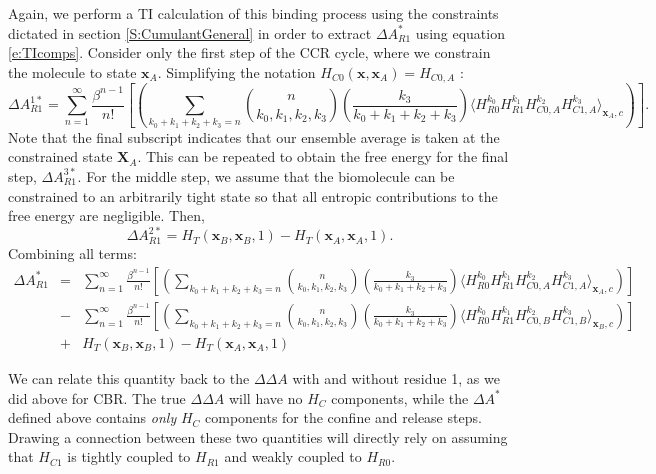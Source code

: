 \documentclass[%
 preprint,
 amsmath,amssymb,
 aps,
]{revtex4-1}
\renewcommand{\vec}[1]{{\mathbf{#1}}}
\begin{document}
 
 Again,
 we perform a TI calculation of this binding process using the constraints dictated in section \ref{S:CumulantGeneral} in order to extract $\Delta A^*_{R1}$ using equation \ref{e:TIcomps}.  Consider only the first step of the CCR cycle, where we constrain the molecule to state $\vec{x}_A$.  Simplifying the notation $H_{C0}\left( \vec{x},\vec{x}_A  \right) = H_{C0,A}$ : 
 \begin{equation}
\Delta A^{1*}_ {R1}=
\sum_{n=1}^{\infty}  \frac{\beta^{n-1}}{n!} 
\left[
\left(
 \sum_{k_0+k_1+k_2+k_3=n} 
{ n \choose k_0,k_1,k_2,k_3 } \left( \frac{k_3}{k_0+k_1+k_2+k_3} \right) \langle  
H_{R0}^{k_0} H_{R1}^{k_1} H_{C0,A}^{k_2} H_{C1,A}^{k_3} 
\rangle_{\vec{x}_A,c}
\right)
\right].
\label{e:BradyDecomp:CCR1}
\end{equation}
Note that the final subscript indicates that our ensemble average is taken at the constrained state $\vec{X}_A$. 
 This can be repeated to obtain the free energy for the final step, $\Delta A^{3*}_ {R1}$. 
 For the middle step, we assume that the biomolecule can be constrained to an arbitrarily tight state so that all entropic contributions to the free energy are negligible.  Then, 
 \begin{equation}
 \Delta A^{2*}_ {R1}= H_T \left( \vec{x}_B,\vec{x}_B,1 \right) -  H_T \left( \vec{x}_A,\vec{x}_A,1 \right) .
 \label{e:CCREnthalpy}
 \end{equation}
 Combining all terms:
  \begin{eqnarray}
\Delta A^*_ {R1} &=&
\sum_{n=1}^{\infty}  \frac{\beta^{n-1}}{n!} 
\left[
\left(
 \sum_{k_0+k_1+k_2+k_3=n} 
{ n \choose k_0,k_1,k_2,k_3 } \left( \frac{k_3}{k_0+k_1+k_2+k_3} \right) \langle  
H_{R0}^{k_0} H_{R1}^{k_1} H_{C0,A}^{k_2} H_{C1,A}^{k_3} 
\rangle_{\vec{x}_A,c}
\right)
\right] \nonumber \\ 
& - &
\sum_{n=1}^{\infty}  \frac{\beta^{n-1}}{n!} 
\left[
\left(
 \sum_{k_0+k_1+k_2+k_3=n} 
{ n \choose k_0,k_1,k_2,k_3 } \left( \frac{k_3}{k_0+k_1+k_2+k_3} \right) \langle  
H_{R0}^{k_0} H_{R1}^{k_1} H_{C0,B}^{k_2} H_{C1,B}^{k_3} 
\rangle_{\vec{x}_B,c}
\right)
\right] \nonumber \\ 
& + &
H_T \left( \vec{x}_B,\vec{x}_B,1 \right) -  H_T \left( \vec{x}_A,\vec{x}_A,1 \right) 
\label{e:BradyTotal:CCR}
\end{eqnarray}
 
 We can relate this quantity back to the $\Delta \Delta A$ with and without residue 1, as we did above for CBR.  The true $\Delta \Delta A$ will have no $H_C$ components, while the $\Delta A^*$ defined above contains \emph{only} $H_C$ components for the confine and release steps.  
 Drawing a connection between these two quantities will directly rely on assuming that $H_{C1}$ is tightly coupled to 
  $H_{R1}$ and weakly coupled to  $H_{R0}$. 
 
\end{document}
